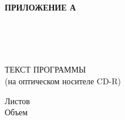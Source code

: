   \begin{flushright}
    \fontsize{16pt}{16pt}\selectfont
    \textbf{ПРИЛОЖЕНИЕ А} \enspace
  \end{flushright}
  
  \begin{center}
    \linespread{1.5}
    \fontsize{16pt}{16pt}\selectfont
    \envDiplomEducation \\
    \fontsize{14.5pt}{16pt}\selectfont
    \envDiplomUniversity \\
    \fontsize{16pt}{16pt}\selectfont
    \vspace{1.5em}
    \envDiplomCathedra \\
  \end{center}

  \vfill

  \begin{center}
    \envDiplomTitleUppercased
  \end{center}


  \begin{center}
    ТЕКСТ ПРОГРАММЫ \\
    (на оптическом носителе CD-R)
  \end{center}

  \begin{center}
    \fontsize{16pt}{16pt}\selectfont
    \textbf{\envCode}
  \end{center}

  \vspace{2.5em}

  \begin{addmargin}[9cm]{0em}
    \fontsize{16pt}{16pt}\selectfont
    Листов \pageref{LastPage} \\
    Объем \envGPRProgramTextSize
  \end{addmargin}

  \vspace{2.5em}

  

  \vfill

  \begin{center}
    \ESKDtheYear
  \end{center}
